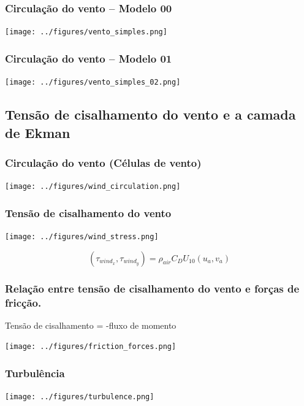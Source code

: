 \begin{frame}
  \frametitle{Circulação do vento -- Modelo 00}
  \begin{center}
    \texttt{[image: ../figures/vento\_simples.png]}
  \end{center}
\end{frame}


\begin{frame}
  \frametitle{Circulação do vento -- Modelo 01}
  \begin{center}
    \texttt{[image: ../figures/vento\_simples\_02.png]}
  \end{center}
\end{frame}


\subsection{Tensão de cisalhamento do vento e a camada de Ekman}
\begin{frame}
  \frametitle{Circulação do vento (Células de vento)}
  \begin{center}
    \texttt{[image: ../figures/wind\_circulation.png]}
  \end{center}
\end{frame}


\begin{frame}
  \frametitle{Tensão de cisalhamento do vento}
  \begin{center}
    \texttt{[image: ../figures/wind\_stress.png]}
  \end{center}
  \[
    (\tau_{wind_x}, \tau_{wind_y}) = \rho_{air} C_D U_{10}(u_a, v_a)
  \]
\end{frame}


\begin{frame}
  \frametitle{Relação entre tensão de cisalhamento do vento e forças de fricção.}
  \begin{block}{}
    Tensão de cisalhamento = -fluxo de momento
  \end{block}
  \begin{center}
    \texttt{[image: ../figures/friction\_forces.png]}
  \end{center}
\end{frame}


\begin{frame}
  \frametitle{Turbulência}
  \begin{center}
    \texttt{[image: ../figures/turbulence.png]}
  \end{center}
\end{frame}


